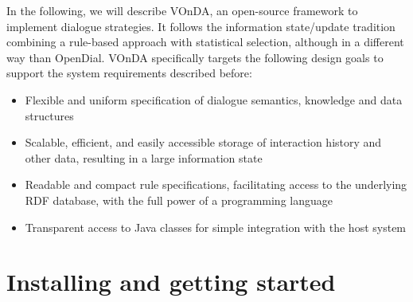\documentclass[a4paper]{report}
\newcommand{\vonda}{VOnDA\xspace}
\begin{document}
In the following, we will describe \vonda, an open-source framework to
implement dialogue strategies. It follows the information state/update
tradition \citep{traum2003information}
combining a rule-based approach with statistical selection, although in a
different way than OpenDial. \vonda specifically targets the following design
goals to support the system requirements described before:

\begin{itemize}
  \addtolength{\itemsep}{-.6\itemsep}
\item Flexible and uniform specification of dialogue semantics, knowledge and
  data structures
\item Scalable, efficient, and easily accessible storage of interaction history
  and other data, resulting in a large information state
\item Readable and compact rule specifications, facilitating access to the
  underlying RDF database, with the full power of a programming language
\item Transparent access to Java classes for simple integration with the host
  system
\end{itemize}
\fi



%

\chapter{Installing and getting started}









\end{document}
